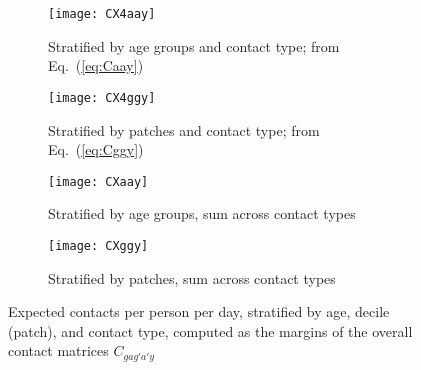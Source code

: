 \begin{figure}
  \begin{subfigure}{\linewidth}
    \texttt{[image: CX4aay]}
    \caption{Stratified by age groups and contact type; from Eq.~(\ref{eq:Caay})}
    \label{fig:CX4aay}
  \end{subfigure}
  \begin{subfigure}{\linewidth}
    \texttt{[image: CX4ggy]}
    \caption{Stratified by patches and contact type; from Eq.~(\ref{eq:Cggy})}
    \label{fig:CX4ggy}
  \end{subfigure}
  \begin{subfigure}{0.48\linewidth}
    \centering
    \texttt{[image: CXaay]}
    \caption{Stratified by age groups, sum across contact types}
    \label{fig:CXaay}
  \end{subfigure}\hfill%
  \begin{subfigure}{0.48\linewidth}
    \centering
    \texttt{[image: CXggy]}
    \caption{Stratified by patches, sum across contact types}
    \label{fig:CXggy}
  \end{subfigure}
  \caption{Expected contacts per person per day, stratified by age, decile (patch), and contact type,
    computed as the margins of the overall contact matrices $C_{gag'a'y}$}
  \label{fig:CX4y}
\end{figure}